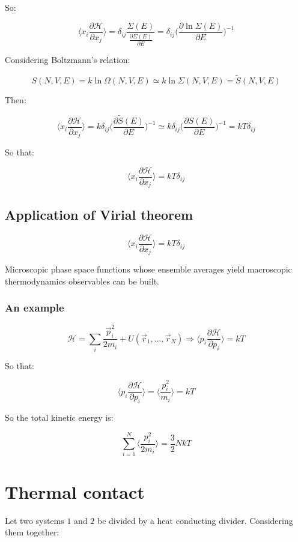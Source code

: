 So:

$$\biggl\langle x_i\frac{\partial\mathcal{H}}{\partial x_j}\biggr\rangle = \delta_{ij}\frac{\Sigma(E)}{\frac{\partial\Sigma(E)}{\partial E}} = \delta_{ij}\biggl(\frac{\partial\ln\Sigma(E)}{\partial E}\biggr)^{-1}$$

Considering Boltzmann's relation:

$$S(N, V, E) = k\ln\Omega(N, V, E)\simeq k\ln\Sigma(N, V, E) = \tilde{S}(N, V, E)$$

Then:

$$\biggl\langle x_i\frac{\partial\mathcal{H}}{\partial x_j}\biggr\rangle = k\delta_{ij}\biggl(\frac{\partial\tilde{S}(E)}{\partial E}\biggr)^{-1}\simeq k\delta_{ij}\biggl(\frac{\partial S(E)}{\partial E}\biggr)^{-1} =kT\delta_{ij}$$

So that:

$$\biggl\langle x_i\frac{\partial\mathcal{H}}{\partial x_j}\biggr\rangle = kT\delta_{ij}$$

	\subsection{Application of Virial theorem}

	$$\biggl\langle x_i\frac{\partial\mathcal{H}}{\partial x_j}\biggr\rangle = kT\delta_{ij}$$

	Microscopic phase space functions whose ensemble averages yield macroscopic thermodynamics observables can be built.

		\subsubsection{An example}

		$$\mathcal{H} = \sum\limits_i\frac{\vec{p}_i^2}{2m_i} + U(\vec{r}_1, \dots, \vec{r}_N)\Rightarrow\biggl\langle p_i\frac{\partial\mathcal{H}}{\partial p_i}\biggr\rangle = kT$$

		So that:

		$$\biggl\langle p_i\frac{\partial\mathcal{H}}{\partial p_i}\biggr\rangle = \biggl\langle\frac{p_i^2}{m_i}\biggr\rangle = kT$$

		So the total kinetic energy is:

		$$\sum\limits_{i=1}^N\biggl\langle\frac{p_i^2}{2m_i}\biggr\rangle = \frac{3}{2}NkT$$

\section{Thermal contact}
Let two systems $1$ and $2$ be divided by a heat conducting divider.
Considering them together:

